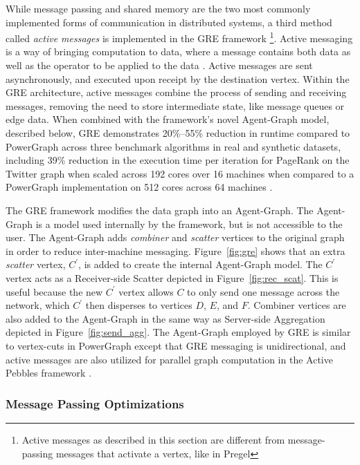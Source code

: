 \documentclass[reprint,twocolumn,showpacs,preprintnumbers,amsmath, aps,pre,amssymb]{revtex4-1}
\begin{document}
While message passing and shared memory are the two most commonly implemented forms of communication in distributed systems, a third method called {\em active messages} is implemented in the GRE framework \cite{Yan2013}\footnote{Active messages as described in this section are different from message-passing messages that activate a vertex, like in Pregel}.  Active messaging is a way of bringing computation to data, where a message contains both data as well as the operator to be applied to the data \cite{VonEicken1992}.  Active messages are sent asynchronously, and executed upon receipt by the destination vertex.  Within the GRE architecture, active messages combine the process of sending and receiving messages, removing the need to store intermediate state, like message queues or edge data.  When combined with the framework's novel Agent-Graph model, described below, GRE demonstrates 20\%--55\% reduction in runtime compared to PowerGraph across three benchmark algorithms in real and synthetic datasets, including 39\% reduction in the execution time per iteration for PageRank on the Twitter graph when scaled across 192 cores over 16 machines when compared to a PowerGraph implementation on 512 cores across 64 machines \cite{Yan2013}.

The GRE framework modifies the data graph into an Agent-Graph.  The Agent-Graph is a model used internally by the framework, but is not accessible to the user.  The Agent-Graph adds \textit{combiner} and \textit{scatter} vertices to the original graph in order to reduce inter-machine messaging.  Figure~\ref{fig:gre} shows that an extra \textit{scatter} vertex, $C^\prime$, is added to create the internal Agent-Graph model. The $C^\prime$ vertex acts as a Receiver-side Scatter depicted in Figure~\ref{fig:rec_scat}.  This is useful because the new $C^\prime$ vertex allows $C$ to only send one message across the network, which $C^\prime$ then disperses to vertices $D$, $E$, and $F$.  Combiner vertices are also added to the Agent-Graph in the same way as Server-side Aggregation depicted in Figure~\ref{fig:send_agg}.  The Agent-Graph employed by GRE is similar to vertex-cuts in PowerGraph except that GRE messaging is unidirectional, and active messages are also utilized for parallel graph computation in the Active Pebbles framework \cite{Willcock2011,Edmonds2013}.

\subsubsection{Message Passing Optimizations}
\label{subsubsec:opts}
\end{document}
